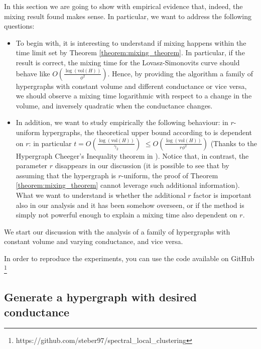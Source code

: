 \documentclass[../main.tex]{subfiles}
\begin{document}
    
    In this section we are going to show with empirical evidence that, indeed, the mixing result found makes sense. In particular, we want to address the following questions: 
    
    \begin{itemize}
        \item To begin with, it is interesting to understand if mixing happens within the time limit set by Theorem \ref{theorem:mixing_theorem}. In particular, if the result is correct, the mixing time for the Lovasz-Simonovits curve should behave like $O\left(\frac{\log(\text{vol}(H))}{\phi^2}\right)$. Hence, by providing the algorithm a family of hypergraphs with constant volume and different conductance or vice versa, we should observe a mixing time logarithmic with respect to a change in the volume, and inversely quadratic when the conductance changes.
        
        \item In addition, we want to study empirically the following behaviour: in $r$-uniform hypergraphs, the theoretical upper bound according to \cite{continuous_laplacian_hypergraph} is dependent on $r$: in particular $t = O\left(\frac{\log(\text{vol}(H))}{\gamma_2}\right)$ $\leq O\left(\frac{\log(\text{vol}(H))}{r \phi^2}\right)$ (Thanks to the Hypergraph Cheeger’s Inequality theorem in \cite{Kapralov2020Nov}). Notice that, in contrast, the parameter $r$ disappears in our discussion (it is possible to see that by assuming that the hypergraph is $r$-uniform, the proof of Theorem \ref{theorem:mixing_theorem} cannot leverage such additional information). What we want to understand is whether the additional $r$ factor is important also in our analysis and it has been somehow overseen, or if the method is simply not powerful enough to explain a mixing time also dependent on $r$.
    \end{itemize}
    
    We start our discussion with the analysis of a family of hypergraphs with constant volume and varying conductance, and vice versa.
    
    In order to reproduce the experiments, you can use the code available on GitHub \footnote{https://github.com/steber97/spectral\_local\_clustering}
    
    \subsection{Generate a hypergraph with desired conductance}
    \label{subsec:generate_hypergraph_with_desired_conductance}
    
\end{document}
